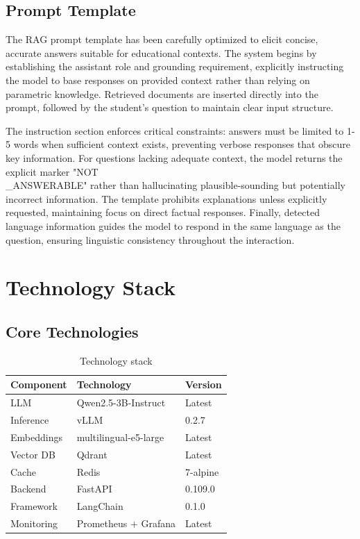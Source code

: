 \documentclass[12pt,a4paper]{article}
\begin{document}
\subsection{Prompt Template}

The RAG prompt template has been carefully optimized to elicit concise, accurate answers suitable for educational contexts. The system begins by establishing the assistant role and grounding requirement, explicitly instructing the model to base responses on provided context rather than relying on parametric knowledge. Retrieved documents are inserted directly into the prompt, followed by the student's question to maintain clear input structure.

The instruction section enforces critical constraints: answers must be limited to 1-5 words when sufficient context exists, preventing verbose responses that obscure key information. For questions lacking adequate context, the model returns the explicit marker "NOT\\_ANSWERABLE" rather than hallucinating plausible-sounding but potentially incorrect information. The template prohibits explanations unless explicitly requested, maintaining focus on direct factual responses. Finally, detected language information guides the model to respond in the same language as the question, ensuring linguistic consistency throughout the interaction.

\section{Technology Stack}

\subsection{Core Technologies}

\begin{table}[H]
\centering
\caption{Technology stack}
\begin{tabular}{@{}lll@{}}
\toprule
\textbf{Component} & \textbf{Technology} & \textbf{Version} \\ \midrule
LLM & Qwen2.5-3B-Instruct & Latest \\
Inference & vLLM & 0.2.7 \\
Embeddings & multilingual-e5-large & Latest \\
Vector DB & Qdrant & Latest \\
Cache & Redis & 7-alpine \\
Backend & FastAPI & 0.109.0 \\
Framework & LangChain & 0.1.0 \\
Monitoring & Prometheus + Grafana & Latest \\ \bottomrule
\end{tabular}
\end{table}
\end{document}
